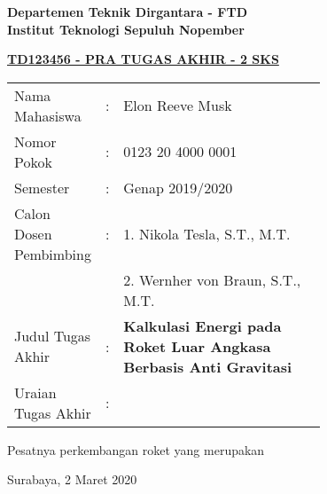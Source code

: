 \begin{flushleft}
  \textbf{Departemen Teknik Dirgantara - FTD}\\
  \textbf{Institut Teknologi Sepuluh Nopember}\\
\end{flushleft}

\begin{center}
  \underline{\textbf{TD123456 - PRA TUGAS AKHIR - 2 SKS}}
\end{center}

\begin{adjustwidth}{-0.2cm}{}
  \begin{tabular}{lcp{0.7\linewidth}}

    Nama Mahasiswa &:& Elon Reeve Musk \\
    Nomor Pokok &:&	0123 20 4000 0001 \\

    Semester &:& Genap 2019/2020 \\

    Calon Dosen Pembimbing &:& 1. Nikola Tesla, S.T., M.T. \\
    & & 2. Wernher von Braun, S.T., M.T. \\

    Judul Tugas Akhir &:& \textbf{Kalkulasi Energi pada Roket Luar Angkasa Berbasis Anti Gravitasi} \\

    Uraian Tugas Akhir &:& \\
  \end{tabular}
\end{adjustwidth}

Pesatnya perkembangan roket yang merupakan \lipsum[1]
\vspace{1ex}

\begin{flushright}
  Surabaya, 2 Maret 2020
\end{flushright}
\vspace{1ex}


